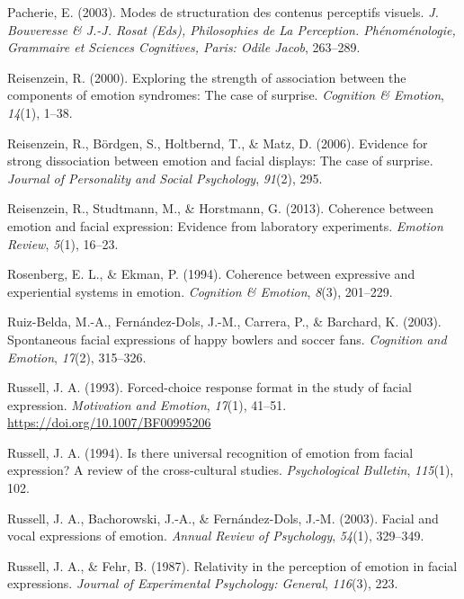 \documentclass[man]{apa6}
\begin{document}
\leavevmode\hypertarget{ref-pacherie2003modes}{}%
Pacherie, E. (2003). Modes de structuration des contenus perceptifs visuels. \emph{J. Bouveresse \& J.-J. Rosat (Eds), Philosophies de La Perception. Phénoménologie, Grammaire et Sciences Cognitives, Paris: Odile Jacob}, 263--289.

\leavevmode\hypertarget{ref-reisenzein2000exploring}{}%
Reisenzein, R. (2000). Exploring the strength of association between the components of emotion syndromes: The case of surprise. \emph{Cognition \& Emotion}, \emph{14}(1), 1--38.

\leavevmode\hypertarget{ref-reisenzein2006evidence}{}%
Reisenzein, R., Bördgen, S., Holtbernd, T., \& Matz, D. (2006). Evidence for strong dissociation between emotion and facial displays: The case of surprise. \emph{Journal of Personality and Social Psychology}, \emph{91}(2), 295.

\leavevmode\hypertarget{ref-reisenzein2013coherence}{}%
Reisenzein, R., Studtmann, M., \& Horstmann, G. (2013). Coherence between emotion and facial expression: Evidence from laboratory experiments. \emph{Emotion Review}, \emph{5}(1), 16--23.

\leavevmode\hypertarget{ref-rosenberg1994coherence}{}%
Rosenberg, E. L., \& Ekman, P. (1994). Coherence between expressive and experiential systems in emotion. \emph{Cognition \& Emotion}, \emph{8}(3), 201--229.

\leavevmode\hypertarget{ref-ruiz2003spontaneous}{}%
Ruiz-Belda, M.-A., Fernández-Dols, J.-M., Carrera, P., \& Barchard, K. (2003). Spontaneous facial expressions of happy bowlers and soccer fans. \emph{Cognition and Emotion}, \emph{17}(2), 315--326.

\leavevmode\hypertarget{ref-russell1993forced}{}%
Russell, J. A. (1993). Forced-choice response format in the study of facial expression. \emph{Motivation and Emotion}, \emph{17}(1), 41--51. \url{https://doi.org/10.1007/BF00995206}

\leavevmode\hypertarget{ref-russell1994there}{}%
Russell, J. A. (1994). Is there universal recognition of emotion from facial expression? A review of the cross-cultural studies. \emph{Psychological Bulletin}, \emph{115}(1), 102.

\leavevmode\hypertarget{ref-russell2003facial}{}%
Russell, J. A., Bachorowski, J.-A., \& Fernández-Dols, J.-M. (2003). Facial and vocal expressions of emotion. \emph{Annual Review of Psychology}, \emph{54}(1), 329--349.

\leavevmode\hypertarget{ref-russell1987relativity}{}%
Russell, J. A., \& Fehr, B. (1987). Relativity in the perception of emotion in facial expressions. \emph{Journal of Experimental Psychology: General}, \emph{116}(3), 223.
\end{document}

